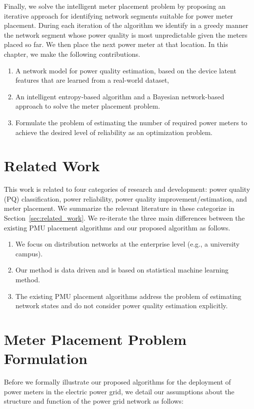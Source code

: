 Finally, we solve the intelligent meter placement problem by proposing an iterative approach for identifying network segments suitable for power meter placement. During each iteration of the algorithm we identify in a greedy manner the network segment whose power quality is most unpredictable given the meters placed so far. We then place the next power meter at that location. In this chapter, we make the following contributions. 
\begin{enumerate}
	\item A network model for power quality estimation, based on the device latent features that are learned from a real-world dataset, 
	\item An intelligent entropy-based algorithm and a Bayesian network-based approach to solve the meter placement problem.
	\item Formulate the problem of estimating the number of required power meters to achieve the desired level of reliability as an optimization problem.
\end{enumerate}

\section{Related Work}
This work is related to four categories of research and development: power quality (PQ) classification, power reliability, power quality improvement/estimation, and meter placement. We summarize the relevant literature in these categorize in Section~\ref{sec:related_work}. We re-iterate the three main differences between the existing PMU placement algorithms and our proposed algorithm as follows.

\begin{enumerate}
\item We focus on distribution networks at the enterprise level (e.g., a university campus).
\item Our method is data driven and is based on statistical machine learning method.
\item The existing PMU placement algorithms address the problem of estimating network states and do not consider power quality estimation explicitly.
\end{enumerate}

\section{Meter Placement Problem Formulation}
Before we formally illustrate our proposed algorithms for the deployment of power meters in the electric power grid, we detail our assumptions about the structure and function of the power grid network as follows:

